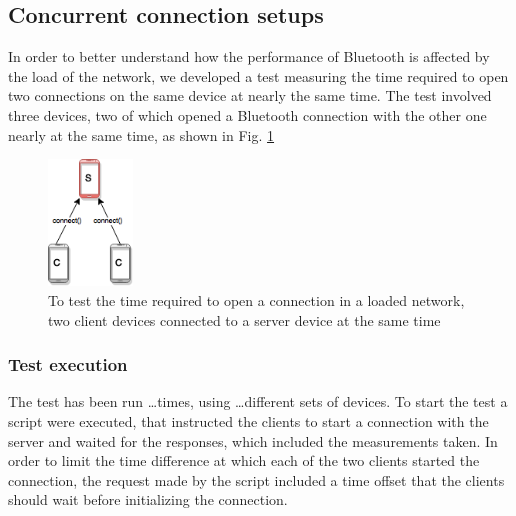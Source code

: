 \subsection{Concurrent connection setups}
In order to better understand how the performance of Bluetooth is affected by the load of the network, we developed a test measuring the time required to open two connections on the same device at nearly the same time.
The test involved three devices, two of which opened a Bluetooth connection with the other one nearly at the same time, as shown in Fig. \ref{figure:collision}

\begin{figure}[ht!]
  \centering
  \includegraphics[width=0.2\textwidth]{application/img/collision.png} 
  \caption{To test the time required to open a connection in a loaded network, two client devices connected to a server device at the same time}
  \label{figure:collision}
\end{figure}

\subsubsection{Test execution}
The test has been run \dots times, using \dots different sets of devices.
To start the test a script were executed, that instructed the clients to start a connection with the server and waited for the responses, which included the measurements taken.
In order to limit the time difference at which each of the two clients started the connection, the request made by the script included a time offset that the clients should wait before initializing the connection.